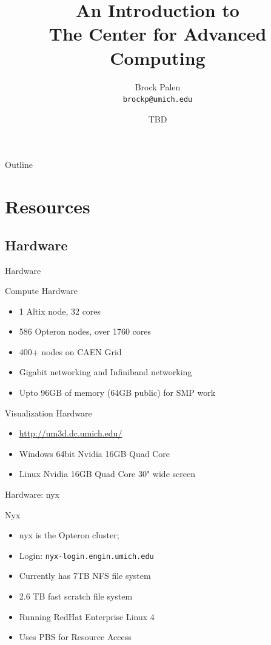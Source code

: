 \documentclass{beamer}
\title[CAC Intro] {An Introduction to\\ The Center for Advanced Computing}
\author{Brock Palen\\ \texttt{brockp@umich.edu}}
\date{TBD}
\begin{document}
  \begin{frame}
    \titlepage
  \end{frame}

  \begin{frame}{Outline}
    \tableofcontents
  \end{frame}
  
  \section{Resources}
  \subsection {Hardware}

  \begin{frame}{Hardware}
   \begin{block}{Compute Hardware}
    \begin{itemize}
    \item 1 Altix node, 32 cores
    \item 586 Opteron nodes, over 1760 cores
    \item 400+ nodes on CAEN Grid
    \item Gigabit networking and Infiniband networking
    \item Upto 96GB of memory (64GB public) for SMP work
    \end{itemize}
   \end{block}
   \begin{block}{Visualization Hardware}
    \begin{itemize}
     \item \url{http://um3d.dc.umich.edu/}
     \item Windows 64bit Nvidia 16GB Quad Core
     \item Linux Nvidia 16GB Quad Core 30" wide screen
    \end{itemize}
   \end{block}
  \end{frame}
  \begin{frame}{Hardware: nyx}
    \begin{block}{Nyx}
    \begin{itemize}
    \item nyx is the Opteron cluster;
    \item Login: \texttt{nyx-login.engin.umich.edu}
    \item Currently has 7TB NFS file system
    \item 2.6 TB fast scratch file system
    \item Running RedHat Enterprise Linux 4
    \item Uses PBS for Resource Access
    \end{itemize}
   \end{block}
  \end{frame}
\end{document}
